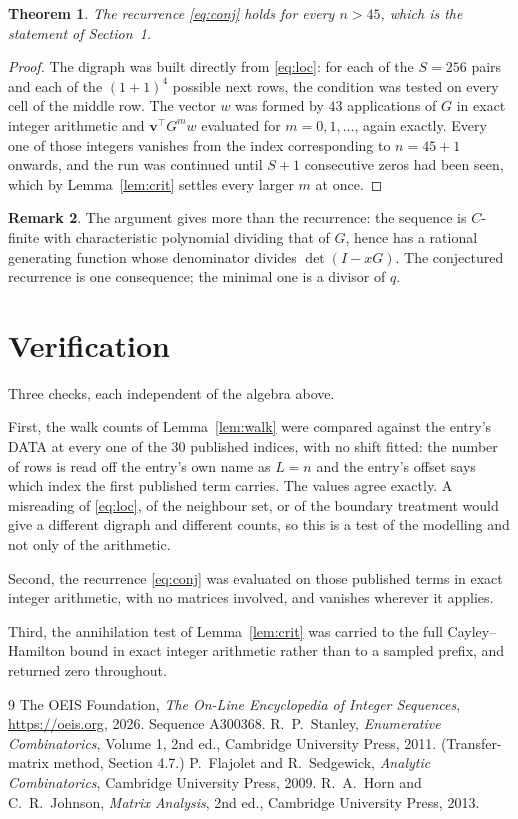 \documentclass[11pt,a4paper]{article}
\theoremstyle{plain}
\newtheorem{theorem}{Theorem}
\theoremstyle{definition}
\newtheorem{remark}[theorem]{Remark}
\begin{document}
\begin{theorem}
The recurrence \eqref{eq:conj} holds for every $n>45$, which is the statement of
Section~1.
\end{theorem}

\begin{proof}
The digraph was built directly from \eqref{eq:loc}: for each of the $S=256$ pairs and each
of the $(1+1)^{4}$ possible next rows, the condition was tested on every cell of
the middle row. The vector $w$ was formed by $43$ applications of $G$ in exact integer
arithmetic and $\mathbf{v}^{\!\top}G^{m}w$ evaluated for $m=0,1,\dots$, again exactly.
Every one of those integers vanishes from the index corresponding to $n=45+1$ onwards,
and the run was continued until $S+1$ consecutive zeros had been seen, which by
Lemma~\ref{lem:crit} settles every larger $m$ at once.
\end{proof}

\begin{remark}
The argument gives more than the recurrence: the sequence is $C$-finite with characteristic
polynomial dividing that of $G$, hence has a rational generating function whose denominator
divides $\det(I-xG)$. The conjectured recurrence is one consequence; the minimal one is a
divisor of $q$.
\end{remark}

\section{Verification}

Three checks, each independent of the algebra above.

First, the walk counts of Lemma~\ref{lem:walk} were compared against the entry's DATA at
every one of the $30$ published indices, with no shift fitted: the number of rows is
read off the entry's own name as $L=n$ and the entry's offset says which index the first
published term carries. The values agree exactly. A misreading of \eqref{eq:loc}, of the
neighbour set, or of the boundary treatment would give a different digraph and different
counts, so this is a test of the modelling and not only of the arithmetic.

Second, the recurrence \eqref{eq:conj} was evaluated on those published terms in exact
integer arithmetic, with no matrices involved, and vanishes wherever it applies.

Third, the annihilation test of Lemma~\ref{lem:crit} was carried to the full
Cayley--Hamilton bound in exact integer arithmetic rather than to a sampled prefix, and
returned zero throughout.

\begin{thebibliography}{9}
 The OEIS Foundation, \emph{The On-Line Encyclopedia of Integer
Sequences}, \url{https://oeis.org}, 2026. Sequence A300368.
 R.~P.~Stanley, \emph{Enumerative Combinatorics}, Volume 1, 2nd ed.,
Cambridge University Press, 2011. (Transfer-matrix method, Section 4.7.)
 P.~Flajolet and R.~Sedgewick, \emph{Analytic Combinatorics}, Cambridge
University Press, 2009.
 R.~A.~Horn and C.~R.~Johnson, \emph{Matrix Analysis}, 2nd ed., Cambridge
University Press, 2013.
\end{thebibliography}
\end{document}
